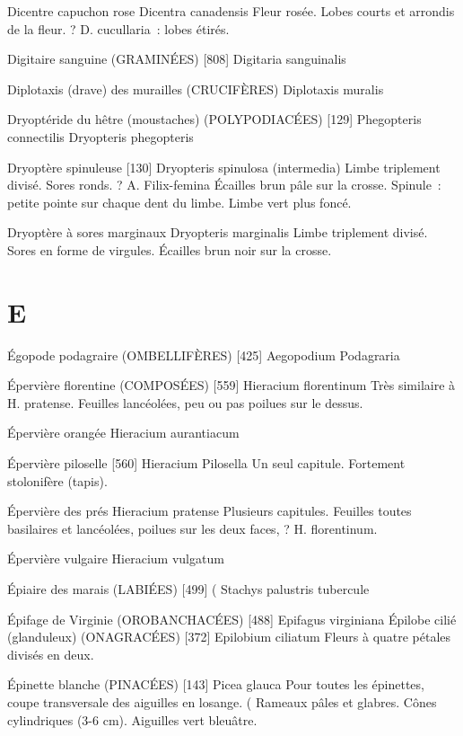Dicentre capuchon rose
				Dicentra canadensis
Fleur rosée. Lobes courts et arrondis de la fleur. ? D. cucullaria : lobes étirés.

Digitaire sanguine (GRAMINÉES)  [808]
				Digitaria sanguinalis

Diplotaxis (drave) des murailles  (CRUCIFÈRES)
				Diplotaxis muralis



Dryoptéride du hêtre (moustaches) (POLYPODIACÉES)  [129]
				Phegopteris connectilis
				Dryopteris phegopteris

Dryoptère spinuleuse  [130]
				Dryopteris spinulosa (intermedia)
Limbe triplement divisé. Sores ronds.
? A. Filix-femina
Écailles brun pâle sur la crosse.
Spinule : petite pointe sur chaque dent du limbe.
Limbe vert plus foncé.

Dryoptère à sores marginaux
				Dryopteris marginalis
Limbe triplement divisé. Sores en forme de virgules.
Écailles brun noir sur la crosse.

\chapter*{E}

Égopode podagraire (OMBELLIFÈRES)  [425]
				Aegopodium Podagraria



Épervière florentine (COMPOSÉES)  [559]
				Hieracium florentinum
Très similaire à H. pratense. Feuilles lancéolées, peu ou pas poilues sur le dessus.

Épervière orangée
				Hieracium aurantiacum

Épervière piloselle  [560]
				Hieracium Pilosella
Un seul capitule. Fortement stolonifère (tapis).

Épervière des prés
				Hieracium pratense
Plusieurs capitules. Feuilles toutes basilaires et lancéolées, poilues sur les deux faces, ? H. florentinum.

Épervière vulgaire
				Hieracium vulgatum

Épiaire des marais (LABIÉES)  [499]				(
				Stachys palustris			tubercule

Épifage de Virginie (OROBANCHACÉES)  [488]
				Epifagus virginiana
Épilobe cilié (glanduleux) (ONAGRACÉES)  [372]
				Epilobium ciliatum
Fleurs à quatre pétales divisés en deux.

Épinette blanche (PINACÉES)  [143]
				Picea glauca
Pour toutes les épinettes, coupe transversale des aiguilles en losange. (
Rameaux pâles et glabres. Cônes cylindriques (3-6 cm).
Aiguilles vert bleuâtre.

